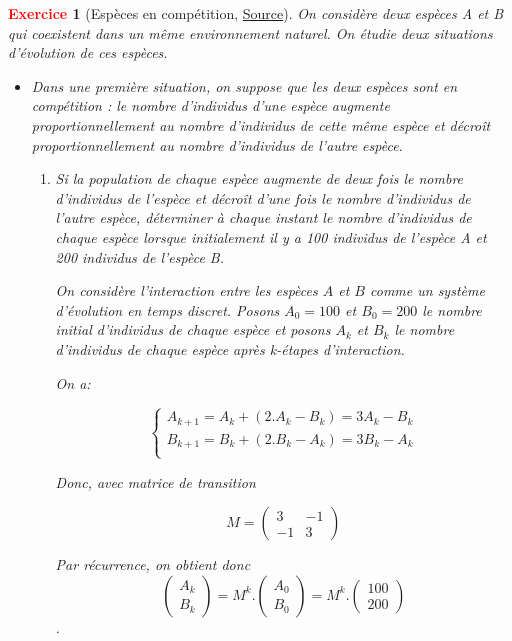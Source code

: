\documentclass[11pt]{article}
\theoremstyle{mythmstyle}
\newtheorem{exo}{\textcolor{red}{\textbf{Exercice}}}
\begin{document}
 
 \begin{exo}
 [Espèces en compétition, \href{http://math.univ-lyon1.fr/homes-www/malbos/Ens/amalaa11.pdf}{Source}]
  On considère deux espèces A et B qui coexistent dans un même environnement naturel. On étudie deux situations d’évolution de ces espèces.
  
  \begin{itemize}
  \item Dans une première situation, on suppose que les deux espèces sont en compétition : le nombre d’individus d’une espèce augmente proportionnellement au nombre d’individus de cette même espèce et décroît proportionnellement au nombre d’individus de l’autre espèce.
 \begin{enumerate}
     \item Si la population de chaque espèce augmente de deux fois le nombre d’individus de l’espèce et décroît d’une fois le nombre d’individus de l’autre espèce, déterminer à chaque instant le nombre d’individus de chaque espèce lorsque initialement il y a 100 individus de l’espèce A et 200 individus de l’espèce B.
     
\begin{solution}
    On considère l'interaction entre les espèces $A$ et $B$ comme un système d'évolution en temps discret. Posons $A_0= 100$ et $B_0=200$ le nombre initial d'individus de chaque espèce et posons $A_k$ et $B_k$ le nombre d'individus de chaque espèce après k-étapes d'interaction.
    
    
    On a:
    
    $$\begin{cases}
    A_{k+1}=A_k + (2.A_k - B_k)= 3A_k - B_k\\
    B_{k+1}=B_k + (2.B_k- A_k)= 3B_k - A_k\\
    \end{cases}$$
    
    Donc, avec matrice de transition
    
    $$
    M=\begin{pmatrix}3&-1\\ -1& 3\end{pmatrix}
    $$
    
    Par récurrence, on obtient donc
    $$\begin{pmatrix} A_{k}\\B_{k}\end{pmatrix}=M^k.\begin{pmatrix} A_{0}\\B_{0}\end{pmatrix}=M^k.\begin{pmatrix} 100\\200\end{pmatrix}
     $$.
     

\end{solution}
\end{enumerate}
\end{itemize}
\end{exo}
\end{document}
